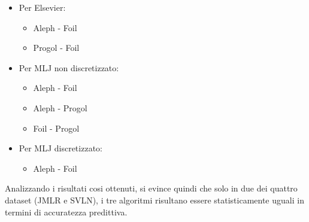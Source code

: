 \begin{itemize}
	\item Per Elsevier:
		\begin{itemize}
			\item Aleph - Foil
			\item Progol - Foil
		\end{itemize}
	\item Per MLJ non discretizzato:
		\begin{itemize}
			\item Aleph - Foil
			\item Aleph - Progol
			\item Foil - Progol
		\end{itemize}
	\item Per MLJ discretizzato:
		\begin{itemize}
			\item Aleph - Foil
		\end{itemize}
\end{itemize}

Analizzando i risultati cosi ottenuti, si evince quindi che solo in due dei quattro dataset (JMLR e SVLN), i tre algoritmi risultano essere statisticamente uguali in termini di accuratezza predittiva.
